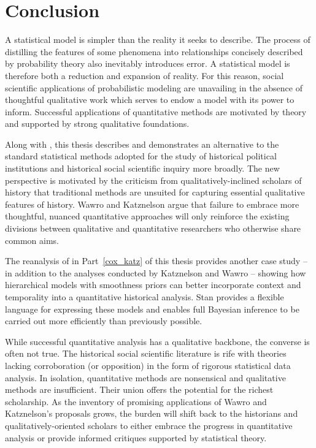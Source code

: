 \chapter{Conclusion}
\label{discussion}

A statistical model is simpler than the reality it seeks to describe. The process of 
distilling the features of some phenomena into relationships concisely described by  
probability theory also inevitably introduces error. A statistical model is therefore both 
a reduction and expansion of reality. For this reason, social scientific applications of 
probabilistic modeling are unavailing in the absence of thoughtful qualitative work which
serves to endow a model with its power to inform. Successful applications of quantitative 
methods are motivated by theory and supported by strong qualitative foundations. 

Along with , this thesis describes and demonstrates 
an alternative to the standard statistical methods adopted for the study of historical 
political institutions and historical social scientific inquiry more broadly. The new perspective is 
motivated by the criticism from qualitatively-inclined scholars of history that traditional methods 
are unsuited for capturing essential qualitative features of history. 
Wawro and Katznelson argue that failure to embrace more thoughtful, nuanced quantitative 
approaches will only reinforce the existing divisions between qualitative and quantitative 
researchers who otherwise share common aims. 

The reanalysis of  in Part~\ref{cox_katz} of this thesis 
provides another case study -- in addition to the analyses conducted by Katznelson and 
Wawro -- showing how hierarchical models with smoothness priors can better incorporate 
context and temporality into a quantitative historical analysis. Stan provides a flexible language 
for expressing these models and enables full Bayesian inference to be carried out 
more efficiently than previously possible.  

While successful quantitative analysis has a qualitative backbone, the converse
is often not true. The historical social scientific literature is rife with 
theories lacking corroboration (or opposition) in the form of rigorous 
statistical data analysis. In isolation, quantitative methods are nonsensical and
qualitative methods are insufficient. Their union offers the potential for the richest 
scholarship.  As the inventory of promising applications of Wawro and 
Katznelson's proposals grows, the burden will shift back to the historians and 
qualitatively-oriented scholars to either embrace the progress in quantitative analysis 
or provide informed critiques supported by statistical theory. 

